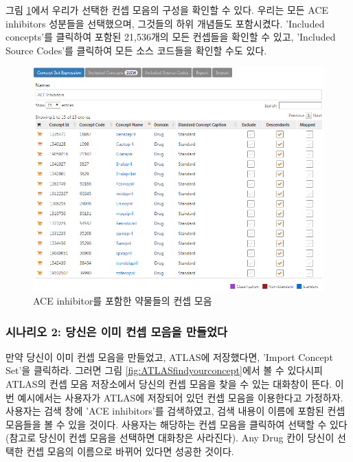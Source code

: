 \documentclass[11pt]{book}
\theoremstyle{definition}
\theoremstyle{definition}
\theoremstyle{definition}
\theoremstyle{remark}
\begin{document}
그림 \ref{fig:aceConceptSetExpression}에서 우리가 선택한 컨셉 모음의
구성을 확인할 수 있다. 우리는 모든 ACE inhibitors 성분들을 선택했으며,
그것들의 하위 개념들도 포함시켰다. 'Included concepts'를 클릭하여 포함된
21,536개의 모든 컨셉들을 확인할 수 있고, 'Included Source Codes'를
클릭하여 모든 소스 코드들을 확인할 수도 있다.

\begin{figure}

{\centering \includegraphics[width=1\linewidth]{images/Cohorts/aceConceptSetExpression} 

}

\caption{ACE inhibitor를 포함한 약물들의 컨셉 모음}\label{fig:aceConceptSetExpression}
\end{figure}

\subsubsection*{시나리오 2: 당신은 이미 컨셉 모음을
만들었다}\label{-2-----}

만약 당신이 이미 컨셉 모음을 만들었고, ATLAS에 저장했다면, 'Import
Concept Set'을 클릭하라. 그러면 그림 \ref{fig:ATLASfindyourconcept}에서
볼 수 있다시피 ATLAS의 컨셉 모음 저장소에서 당신의 컨셉 모음을 찾을 수
있는 대화창이 뜬다. 이번 예시에서는 사용자가 ATLAS에 저장되어 있던 컨셉
모음을 이용한다고 가정하자. 사용자는 검색 창에 'ACE inhibitors'를
검색하였고, 검색 내용이 이름에 포함된 컨셉 모음들을 볼 수 있을 것이다.
사용자는 해당하는 컨셉 모음을 클릭하여 선택할 수 있다 (참고로 당신이
컨셉 모음을 선택하면 대화창은 사라진다). Any Drug 칸이 당신이 선택한
컨셉 모음의 이름으로 바뀌어 있다면 성공한 것이다.
\end{document}
